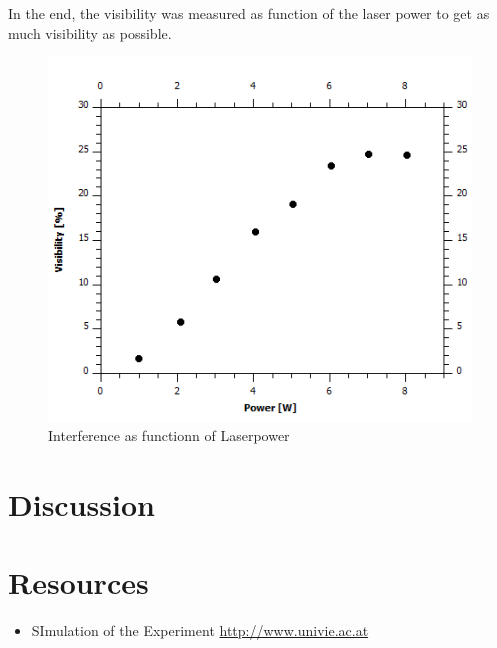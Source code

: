\documentclass[12pt,a4paper]{article}
\begin{document}
\begin{multicols}{2}
In the end, the visibility was measured as function of the laser power to get as much visibility as possible.
\begin{figure}[H]
\centering
\includegraphics[scale=0.65]{./data/Power.png}
\caption{Interference as functionn of Laserpower}
\label{fig:Laserpower}
\end{figure}




\section{Discussion}


\section{Resources}
\begin{itemize}
	\item SImulation of the Experiment \url{http://www.univie.ac.at}
\end{itemize}
%
%

\end{multicols}
\end{document}
